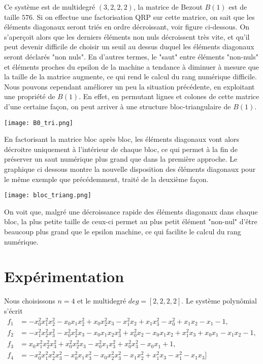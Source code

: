 \documentclass{article}
\theoremstyle{plain}%
\theoremstyle{definition}
\theoremstyle{remark}
\begin{document}
Ce système est de multidegré $(3, 2, 2, 2)$, la matrice de Bezout $B(1)$ est de taille $576$. Si on effectue une factorisation QRP sur cette matrice, on sait que les éléments diagonaux seront triés en ordre décroissant, voir figure ci-dessous.
 On s'aperçoit alors que les derniers éléments non nuls décroissent très vite, et qu'il peut devenir difficile de choisir un seuil au dessus duquel les éléments diagonaux seront déclarés "non nuls".
En d'autres termes, le "saut" entre éléments "non-nuls" et éléments proches du epsilon de la machine a tendance à diminuer à mesure que la taille de la matrice augmente, ce qui rend le calcul du rang numérique difficile.\\
Nous pouvons cependant améliorer un peu la situation précédente, en exploitant une propriété de $B(1)$. En effet, en permutant lignes et colones de cette matrice d'une certaine façon, on peut arriver à une structure bloc-triangulaire de $B(1)$.
\begin{center}
\texttt{[image: B0\_tri.png]}
\end{center}
En factorisant la matrice bloc après bloc, les éléments diagonaux vont alors décroitre uniquement à l'intérieur de chaque bloc, ce qui permet à la fin de préserver un saut numérique plus grand que dans la première approche. Le graphique ci dessous montre la nouvelle disposition des éléments diagonaux pour le même exemple que précédemment, traité de la deuxième façon.
\begin{center}
\texttt{[image: bloc\_triang.png]}
\end{center}
On voit que, malgré une décroissance rapide des éléments diagonaux dans chaque bloc, la plus petite taille de ceux-ci permet au plus petit élément "non-nul" d'être beaucoup plus grand que le epsilon machine, ce qui facilite le calcul du rang numérique.

\section{Expérimentation}
Nous choisissons $n=4$ et le multidegré $deg=[2,2,2,2]$. Le système polynômial s'écrit
\begin{align}
f_1 & =
-x_0^2x_1^2x_2^2 - x_0x_1x_2^2 + x_0x_2^2x_3 - x_1^2x_2 + x_1x_3^2 - x_0^2 + x_1x_2 - x_1 - 1, \nonumber\\
f_2 & =
 -x_1^2x_2^2x_3^2 - x_0^2x_2^2x_3 - x_0x_1x_2x_3^2 + x_0^2x_2 - x_0x_1x_2 + x_1^2x_3 + x_0x_1 - x_1x_2 - 1, \nonumber\\
 f_3 & =
 x_0x_1^2x_2^2x_3^2 + x_0^2x_2^2x_3 - x_0^2x_1x_3^2 + x_0^2x_3^2 - x_0x_1 + 1, \nonumber\\
 f_4 & =
 -x_0^2x_1^2x_2^2x_3^2 - x_0^2x_1x_3^2 - x_0x_2^2x_3^2 - x_1x_2^2 + x_1^2x_3 - x_1^2 - x_1x_3] \nonumber\\
 \end{align}
\end{document}

